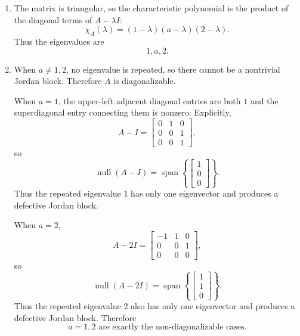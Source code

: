 \documentclass[12pt]{article}
\newcommand{\Null}{\operatorname{null}}
\newcommand{\Span}{\operatorname{span}}
\begin{document}
\begin{enumerate}[label=(\alph*)]
  \item The matrix is triangular, so the characteristic polynomial is the product of the diagonal terms of $A-\lambda I$:
  \[
  \boxed{\chi_A(\lambda)=(1-\lambda)(a-\lambda)(2-\lambda).}
  \]
  Thus the eigenvalues are
  \[
  \boxed{1,a,2.}
  \]

  \item When $a\ne1,2$, no eigenvalue is repeated, so there cannot be a nontrivial Jordan block. Therefore $A$ is diagonalizable.

  When $a=1$, the upper-left adjacent diagonal entries are both $1$ and the superdiagonal entry connecting them is nonzero. Explicitly,
  \[
  A-I=\begin{bmatrix}0&1&0\\0&0&1\\0&0&1\end{bmatrix},
  \]
  so
  \[
  \Null(A-I)=\Span\left\{\begin{bmatrix}1\\0\\0\end{bmatrix}\right\}.
  \]
  Thus the repeated eigenvalue $1$ has only one eigenvector and produces a defective Jordan block.

  When $a=2$,
  \[
  A-2I=\begin{bmatrix}-1&1&0\\0&0&1\\0&0&0\end{bmatrix},
  \]
  so
  \[
  \Null(A-2I)=\Span\left\{\begin{bmatrix}1\\1\\0\end{bmatrix}\right\}.
  \]
  Thus the repeated eigenvalue $2$ also has only one eigenvector and produces a defective Jordan block. Therefore
  \[
  \boxed{a=1,2\text{ are exactly the non-diagonalizable cases}.}
  \]


\end{enumerate}
\end{document}
